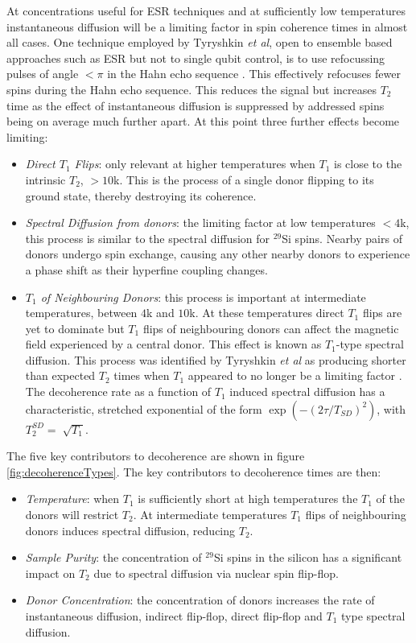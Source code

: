 At concentrations useful for ESR techniques and at sufficiently low temperatures instantaneous diffusion will be a limiting factor in spin coherence times in almost all cases.
One technique employed by Tyryshkin \textit{et al}, open to ensemble based approaches such as ESR but not to single qubit control, is to use refocussing pulses of angle $<\pi$ in the Hahn echo sequence \cite{Tyryshkin2011}.
This effectively refocuses fewer spins during the Hahn echo sequence.
This reduces the signal but increases $T_2$ time as the effect of instantaneous diffusion is suppressed by addressed spins being on average much further apart.
At this point three further effects become limiting:

\begin{itemize}
\item \textit{Direct $T_1$ Flips}: only relevant at higher temperatures when $T_1$ is close to the intrinsic $T_2$, $>10$k. This is the process of a single donor flipping to its ground state, thereby destroying its coherence.
\item \textit{Spectral Diffusion from donors}: the limiting factor at low temperatures $<4$k, this process is similar to the spectral diffusion for $^{29}$Si spins. Nearby pairs of donors undergo spin exchange, causing any other nearby donors to experience a phase shift as their hyperfine coupling changes.
\item \textit{$T_1$ of Neighbouring Donors}: this process is important at intermediate temperatures, between $4$k and $10$k. At these temperatures direct $T_1$ flips are yet to dominate but $T_1$ flips of neighbouring donors can affect the magnetic field experienced by a central donor. This effect is known as $T_1$-type spectral diffusion.
This process was identified by Tyryshkin \textit{et al} as producing shorter than expected $T_2$ times when $T_1$ appeared to no longer be a limiting factor \cite{Tyryshkin2011}.
The decoherence rate as a function of $T_1$ induced spectral diffusion has a characteristic, stretched exponential of the form $\exp(-(2\tau/T_{SD})^2)$, with $T_2^{SD} = \sqrt[]{T_1}$.
\end{itemize}

The five key contributors to decoherence are shown in figure \ref{fig:decoherenceTypes}.
The key contributors to decoherence times are then:

\begin{itemize}
\item \textit{Temperature}: when $T_1$ is sufficiently short at high temperatures the $T_1$ of the donors will restrict $T_2$. At intermediate temperatures $T_1$ flips of neighbouring donors induces spectral diffusion, reducing $T_2$.
\item \textit{Sample Purity}: the concentration of $^{29}$Si spins in the silicon has a significant impact on $T_2$ due to spectral diffusion via nuclear spin flip-flop.
\item \textit{Donor Concentration}: the concentration of donors increases the rate of instantaneous diffusion, indirect flip-flop, direct flip-flop and $T_1$ type spectral diffusion.
\end{itemize}

